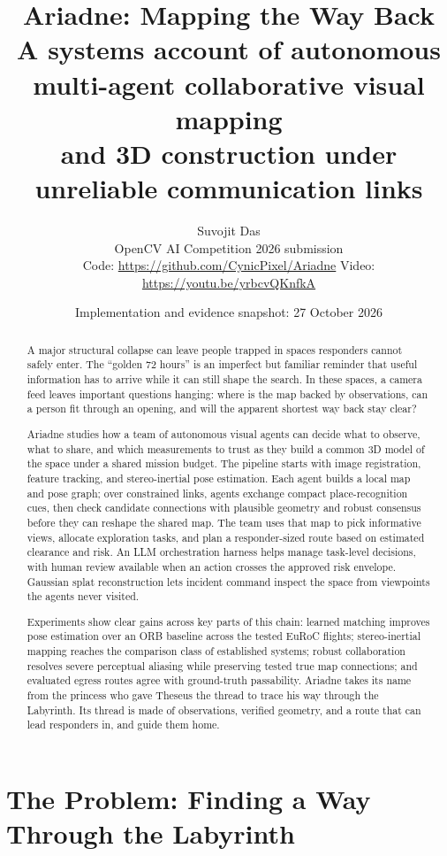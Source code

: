 \documentclass[10pt,a4paper]{article}
\title{\textbf{Ariadne: Mapping the Way Back}\\[0.3em]
\large A systems account of autonomous multi-agent collaborative visual mapping \\ and 3D construction under unreliable communication links}
\author{Suvojit Das\\[0.2em]\small OpenCV AI Competition 2026 submission\\[0.2em]\small Code: \url{https://github.com/CynicPixel/Ariadne} \quad Video: \url{https://youtu.be/yrbcvQKnfkA}}
\date{Implementation and evidence snapshot: 27 October 2026}
\begin{document}
\maketitle

\begin{abstract}
A major structural collapse can leave people trapped in spaces responders cannot safely enter. The “golden 72 hours” is an imperfect but familiar reminder that useful information has to arrive while it can still shape the search. In these spaces, a camera feed leaves important questions hanging: where is the map backed by observations, can a person fit through an opening, and will the apparent shortest way back stay clear?

Ariadne studies how a team of autonomous visual agents can decide what to observe, what to share, and which measurements to trust as they build a common 3D model of the space under a shared mission budget. The pipeline starts with image registration, feature tracking, and stereo-inertial pose estimation. Each agent builds a local map and pose graph; over constrained links, agents exchange compact place-recognition cues, then check candidate connections with plausible geometry and robust consensus before they can reshape the shared map. The team uses that map to pick informative views, allocate exploration tasks, and plan a responder-sized route based on estimated clearance and risk. An LLM orchestration harness helps manage task-level decisions, with human review available when an action crosses the approved risk envelope. Gaussian splat reconstruction lets incident command inspect the space from viewpoints the agents never visited.

Experiments show clear gains across key parts of this chain: learned matching improves pose estimation over an ORB baseline across the tested EuRoC flights; stereo-inertial mapping reaches the comparison class of established systems; robust collaboration resolves severe perceptual aliasing while preserving tested true map connections; and evaluated egress routes agree with ground-truth passability. Ariadne takes its name from the princess who gave Theseus the thread to trace his way through the Labyrinth. Its thread is made of observations, verified geometry, and a route that can lead responders in, and guide them home.
\end{abstract}

\section{The Problem: Finding a Way Through the Labyrinth}
\end{document}
